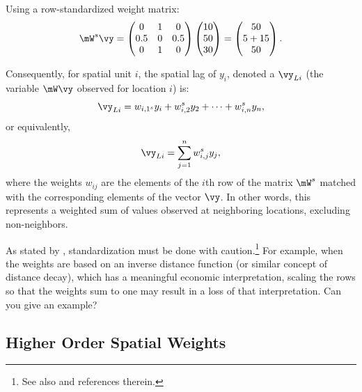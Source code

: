 \documentclass[english,12pt]{book}\usepackage[]{graphicx}\usepackage[]{xcolor}
\begin{document}
Using a row-standardized weight matrix:
\begin{equation*}
  \mW^s\vy =    \begin{pmatrix}
     0 & 1 & 0 \\
     0.5 & 0 & 0.5 \\
     0 & 1 & 0
  \end{pmatrix}
  \begin{pmatrix}
     10 \\
     50 \\
     30
  \end{pmatrix} =
  \begin{pmatrix}
     50 \\
     5 + 15 \\
     50
  \end{pmatrix}.
\end{equation*}

Consequently, for spatial unit $i$, the spatial lag of $y_i$, denoted a $\vy_{Li}$ (the variable $\mW\vy$ observed for location $i$) is:
\begin{equation*}
  \vy_{Li} = w_{i, 1^s}y_i + w_{i, 2}^sy_2 + \cdots + w_{i, n}^sy_n, 
\end{equation*}
%
or equivalently,
\begin{equation*}
  \vy_{Li} = \sum_{j = 1}^nw_{i,j}^sy_j,
\end{equation*}
%
where the weights $w_{ij}$ are the elements of the $i$th row of the matrix $\mW^s$ matched with the corresponding elements of the vector $\vy$. In other words, this represents a weighted sum of values observed at neighboring locations, excluding non-neighbors.

\begin{remark}
As stated by \citet[][p. 23-24]{anselin1988spatial}, standardization must be done with caution.\footnote{See also \citet[][p. 12]{elhorst2014spatial} and references therein.} For example, when the weights are based on an inverse distance function (or similar concept of distance decay), which has a meaningful economic interpretation, scaling the rows so that the weights sum to one may result in a loss of that interpretation. Can you give an example?
\end{remark}


\subsection{Higher Order Spatial Weights}\label{sec:HSO}
\end{document}
